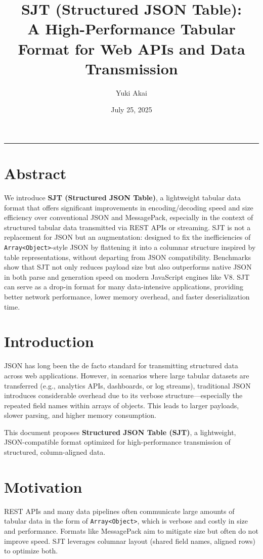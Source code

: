 \documentclass[12pt]{article}
\title{SJT (Structured JSON Table):\\ A High-Performance Tabular Format for Web APIs and Data Transmission}
\author{Yuki Akai}
\date{July 25, 2025}
\begin{document}
\maketitle
\hrule
\vspace{1em}

\section*{Abstract}
We introduce \textbf{SJT (Structured JSON Table)}, a lightweight tabular data format that offers significant improvements in encoding/decoding speed and size efficiency over conventional JSON and MessagePack, especially in the context of structured tabular data transmitted via REST APIs or streaming. SJT is not a replacement for JSON but an augmentation: designed to fix the inefficiencies of \texttt{Array<Object>}-style JSON by flattening it into a columnar structure inspired by table representations, without departing from JSON compatibility. Benchmarks show that SJT not only reduces payload size but also outperforms native JSON in both parse and generation speed on modern JavaScript engines like V8. SJT can serve as a drop-in format for many data-intensive applications, providing better network performance, lower memory overhead, and faster deserialization time.

\section{Introduction}
JSON has long been the de facto standard for transmitting structured data across web applications. However, in scenarios where large tabular datasets are transferred (e.g., analytics APIs, dashboards, or log streams), traditional JSON introduces considerable overhead due to its verbose structure---especially the repeated field names within arrays of objects. This leads to larger payloads, slower parsing, and higher memory consumption.

This document proposes \textbf{Structured JSON Table (SJT)}, a lightweight, JSON-compatible format optimized for high-performance transmission of structured, column-aligned data.

\clearpage
\section{Motivation}
REST APIs and many data pipelines often communicate large amounts of tabular data in the form of \texttt{Array<Object>}, which is verbose and costly in size and performance. Formats like MessagePack aim to mitigate size but often do not improve speed. SJT leverages columnar layout (shared field names, aligned rows) to optimize both.
\end{document}
